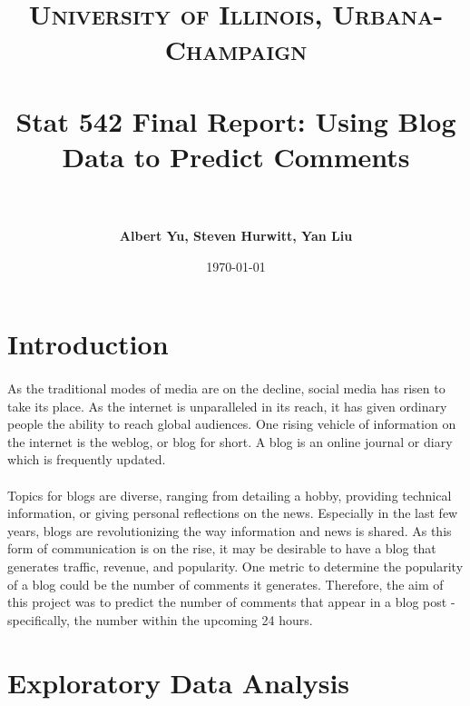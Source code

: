 \documentclass[paper=a4, fontsize=11pt]{scrartcl} %
\title{	
\normalfont \normalsize 
\textsc{University of Illinois, Urbana-Champaign} \\ [25pt] %
\horrule{0.5pt} \\[0.4cm] %
\huge Stat 542 Final Report: Using Blog Data to Predict Comments \\ %
\horrule{2pt} \\[0.5cm] %
}
\author{\textbf{Albert Yu, Steven Hurwitt, Yan Liu}} %
\date{\normalsize\today} %
\numberwithin{equation}{section} %
\numberwithin{figure}{section} %
\numberwithin{table}{section} %
\begin{document}
\maketitle %

\graphicspath{{ /Users/stevenhurwitt/Documents/Illinois/Stat542/FINAL/Pictures }} %


\section{Introduction}

\paragraph{}
As the traditional modes of media are on the decline, social media has risen to take its place. As the internet is unparalleled in its reach, it has given ordinary people the ability to reach global audiences. One rising vehicle of information on the internet is the weblog, or blog for short. A blog is an online journal or diary which is frequently updated.

\paragraph{}
Topics for blogs are diverse, ranging from detailing a hobby, providing technical information, or giving personal reflections on the news. Especially in the last few years, blogs are revolutionizing the way information and news is shared. As this form of communication is on the rise, it may be desirable to have a blog that generates traffic, revenue, and popularity. One metric to determine the popularity of a blog could be the number of comments it generates. Therefore, the aim of this project was to predict the number of comments that appear in a blog post - specifically, the number within the upcoming 24 hours.



\section{Exploratory Data Analysis}
\end{document}

